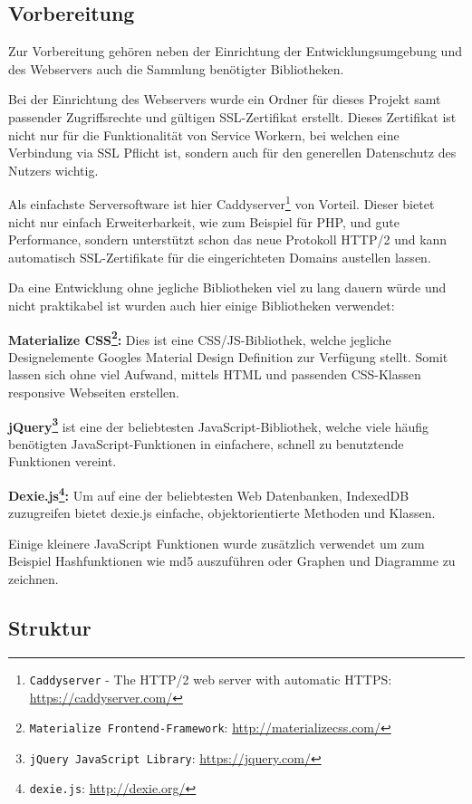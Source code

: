 \documentclass[a4paper,12pt,ngerman]{scrartcl}      %
\let\oldcite\cite
\renewcommand{\cite}[1]{\textsuperscript{\oldcite{#1}}}
\newcommand{\spacer}{\par\bigskip\noindent}
\providecommand{\inlinecode}[1]{\texttt{#1}}
\begin{document}
	\subsection{Vorbereitung}
	Zur Vorbereitung gehören neben der Einrichtung der Entwicklungsumgebung und des Webservers auch die Sammlung benötigter Bibliotheken.\par
	Bei der Einrichtung des Webservers wurde ein Ordner für dieses Projekt samt passender Zugriffsrechte und gültigen SSL-Zertifikat erstellt. Dieses Zertifikat ist nicht nur für die Funktionalität von Service Workern, bei welchen eine Verbindung via SSL Pflicht ist, sondern auch für den generellen Datenschutz des Nutzers wichtig.\par
	Als einfachste Serversoftware ist hier Caddyserver\footnote{\inlinecode{Caddyserver} - The HTTP/2 web server with automatic HTTPS: \url{https://caddyserver.com/}} von Vorteil. Dieser bietet nicht nur einfach Erweiterbarkeit, wie zum Beispiel für PHP, und gute Performance, sondern unterstützt schon das neue Protokoll HTTP/2 und kann automatisch SSL-Zertifikate für die eingerichteten Domains austellen lassen.\par
	\noindent Da eine Entwicklung ohne jegliche Bibliotheken viel zu lang dauern würde und nicht praktikabel ist wurden auch hier einige Bibliotheken verwendet:\par
	\spacer\textbf{Materialize CSS\footnote{\inlinecode{Materialize Frontend-Framework}: \url{http://materializecss.com/}}:} Dies ist eine CSS/JS-Bibliothek, welche jegliche Designelemente Googles Material Design Definition zur Verfügung stellt. Somit lassen sich ohne viel Aufwand, mittels HTML und passenden CSS-Klassen responsive Webseiten erstellen.\par
	\spacer\textbf{jQuery\footnote{\inlinecode{jQuery JavaScript Library}: \url{https://jquery.com/}}} ist eine der beliebtesten JavaScript-Bibliothek\cite{jQueryCoverage}, welche viele häufig benötigten JavaScript-Funktionen in einfachere, schnell zu benutztende Funktionen vereint.\par
	\spacer\textbf{Dexie.js\footnote{\inlinecode{dexie.js}: \url{http://dexie.org/}}:} Um auf eine der beliebtesten Web Datenbanken, IndexedDB zuzugreifen bietet dexie.js einfache, objektorientierte Methoden und Klassen.\par
	\spacer Einige kleinere JavaScript Funktionen wurde zusätzlich verwendet um zum Beispiel Hashfunktionen wie md5 auszuführen oder Graphen und Diagramme zu zeichnen.\par
	\subsection{Struktur}
\end{document}
